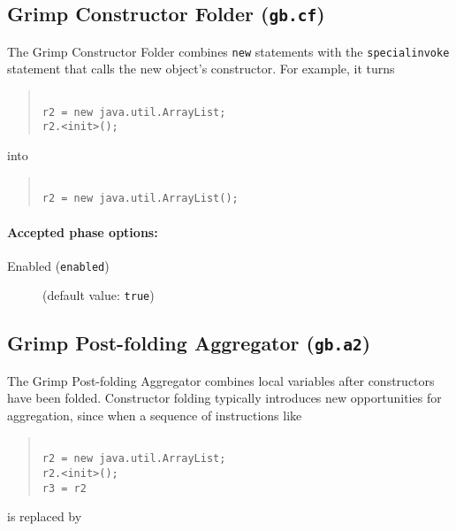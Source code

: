\documentclass{article}
\begin{document}
\subsection{Grimp Constructor Folder ({\tt gb.cf})}

The Grimp Constructor Folder combines {\tt new} statements
with the {\tt specialinvoke} statement that calls the new
object's constructor. For example, it turns

\begin{quote}\begin{verbatim}

r2 = new java.util.ArrayList;
r2.<init>();

\end{verbatim}\end{quote}

into

\begin{quote}\begin{verbatim}

r2 = new java.util.ArrayList();

\end{verbatim}\end{quote}



\paragraph{Accepted phase options:} 

\begin{description}

\item[Enabled ({\tt enabled})]
(default value: {\tt true})






\end{description}

\subsection{Grimp Post-folding Aggregator ({\tt gb.a2})}

The Grimp Post-folding Aggregator combines local variables after
constructors have been folded. Constructor folding typically
introduces new opportunities for aggregation, since when a
sequence of instructions like

\begin{quote}\begin{verbatim}

r2 = new java.util.ArrayList;
r2.<init>();
r3 = r2

\end{verbatim}\end{quote}
is replaced by
\end{document}

